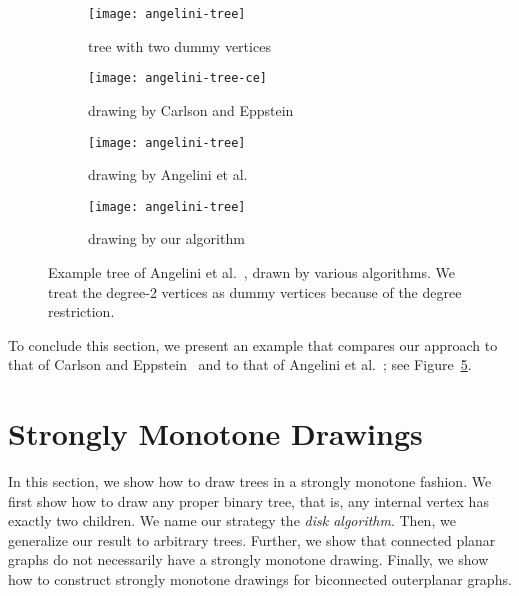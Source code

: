 \documentclass[a4paper,11pt]{article}
\theoremstyle{plain}
\begin{document}
\begin{figure}[tb]
  \centering
  \begin{subfigure}[b]{.44\columnwidth}
    \centering
    \texttt{[image: angelini-tree]}
    \caption{tree with two dummy vertices}
    \label{fig:example-tree-1}
  \end{subfigure}
  \hfill
  \begin{subfigure}[b]{.44\columnwidth}
    \centering
     \texttt{[image: angelini-tree-ce]}
    \caption{drawing by Carlson and Eppstein~\cite{ce-tcfoa-GD06}}
    \label{fig:example-tree-3}
  \end{subfigure}

  \medskip
  \begin{subfigure}[b]{.44\columnwidth}
    \centering
    \texttt{[image: angelini-tree]}
    \caption{drawing by Angelini et al.~\cite{acbfp-mdg-12}}
    \label{fig:example-tree-2}
  \end{subfigure}
  \hfill
  \begin{subfigure}[b]{.44\columnwidth}
    \centering
    \texttt{[image: angelini-tree]}
    \caption{drawing by our algorithm}
    \label{fig:example-tree-4}
  \end{subfigure}

  \caption{Example tree of Angelini et al.~\cite{acbfp-mdg-12}, drawn by
    various algorithms. We treat the degree-2 vertices as dummy
    vertices because of the degree restriction.}
  \label{fig:example}
\end{figure}

To conclude this section, we present an example that compares our
approach to that of Carlson and Eppstein~\cite{ce-tcfoa-GD06} and to
that of Angelini et al.~\cite{acbfp-mdg-12}; see
Figure~\ref{fig:example}.

\section{Strongly Monotone Drawings}
\label{sec:strong}

In this section, we show how to draw trees in a strongly monotone fashion.
We first show how to draw any proper binary tree, that is, any
internal vertex has exactly two children.  We name our strategy
the \emph{disk algorithm}.  Then, we generalize our
result to arbitrary trees. Further, we show that connected planar
graphs do not necessarily have a strongly monotone drawing.  Finally,
we show how to construct strongly monotone drawings for biconnected outerplanar graphs. 
\end{document}
